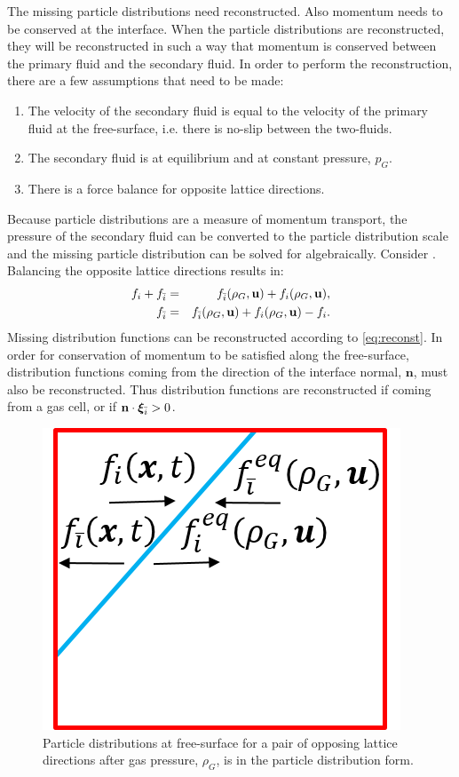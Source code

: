\documentclass[pdftex,ms]{pittetd}
\newcommand{\pvel}{\boldsymbol{\xi}}
\begin{document}
The missing particle distributions need reconstructed.
Also momentum needs to be conserved at the interface.
When the particle distributions are reconstructed, they will be reconstructed in such a way that momentum is conserved between the primary fluid and the secondary fluid.
In order to perform the reconstruction, there are a few assumptions that need to be made:
\begin{enumerate}
\item The velocity of the secondary fluid is equal to the velocity of the primary fluid at the free-surface, i.e. there is no-slip between the two-fluids.
\item The secondary fluid is at equilibrium and at constant pressure, $p_G$.
\item There is a force balance for opposite lattice directions.
\end{enumerate}
Because particle distributions are a measure of momentum transport, the pressure of the secondary fluid can be converted to the particle distribution scale and the missing particle distribution can be solved for algebraically.
Consider .
Balancing the opposite lattice directions results in:
\begin{eqnarray}
f_i + f_{\bar{i}} &=& f_{\bar{i}}(\rho_G, \mathbf{u}) + f_i(\rho_G, \mathbf{u}), \\
\label{eq:reconst} f_{\bar{i}} &=& f_{\bar{i}}(\rho_G, \mathbf{u}) + f_i(\rho_G, \mathbf{u}) - f_i.
\end{eqnarray}
Missing distribution functions can be reconstructed according to \eqref{eq:reconst}.
In order for conservation of momentum to be satisfied along the free-surface, distribution functions coming from the direction of the interface normal, $\mathbf{n}$, must also be reconstructed.
Thus distribution functions are reconstructed if coming from a gas cell, or if $\mathbf{n} \cdot \pvel_\opidx > 0$.

\begin{figure}
\centering
\includegraphics{figs/force-bal-at-interface}
\caption{Particle distributions at free-surface for a pair of opposing lattice directions after gas pressure, $\rho_G$, is in the particle distribution form.}
\label{fig:fbi}
\end{figure}
\end{document}
